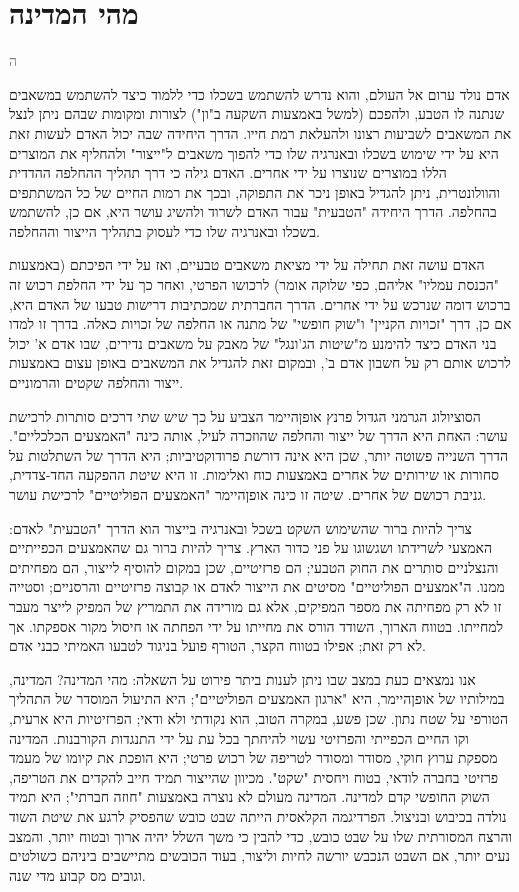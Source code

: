 \documentclass[10pt,oneside]{book}
\newcommand{\hebrewchapter}[2]{%
  \chapter*{#1}%
  \addcontentsline{toc}{chapter}{#1}%
  \lettrine[lines=4, lhang=0.1, loversize=0.5, findent=0pt]{\textcolor{gray} #2}{}%
}
\begin{document}
\hebrewchapter{מהי המדינה}{ה}
אדם נולד ערום אל העולם, והוא נדרש להשתמש בשכלו כדי ללמוד כיצד להשתמש במשאבים שנתנה לו הטבע, ולהפכם (למשל באמצעות השקעה ב"ון") לצורות ומקומות שבהם ניתן לנצל את המשאבים לשביעות רצונו ולהעלאת רמת חייו. הדרך היחידה שבה יכול האדם לעשות זאת היא על ידי שימוש בשכלו ובאנרגיה שלו כדי להפוך משאבים ל"ייצור" ולהחליף את המוצרים הללו במוצרים שנוצרו על ידי אחרים. האדם גילה כי דרך תהליך ההחלפה ההדדית והוולונטרית, ניתן להגדיל באופן ניכר את התפוקה, ובכך את רמות החיים של כל המשתתפים בהחלפה. הדרך היחידה "הטבעית" עבור האדם לשרוד ולהשיג עושר היא, אם כן, להשתמש בשכלו ובאנרגיה שלו כדי לעסוק בתהליך הייצור וההחלפה.

האדם עושה זאת תחילה על ידי מציאת משאבים טבעיים, ואז על ידי הפיכתם (באמצעות "הכנסת עמליו" אליהם, כפי שלוקה אומר) לרכושו הפרטי, ואחר כך על ידי החלפת רכוש זה ברכוש דומה שנרכש על ידי אחרים. הדרך החברתית שמכתיבות דרישות טבעו של האדם היא, אם כן, דרך "זכויות הקניין" ו"שוק חופשי" של מתנה או החלפה של זכויות כאלה. בדרך זו למדו בני האדם כיצד להימנע מ"שיטות הג'ונגל" של מאבק על משאבים נדירים, שבו אדם א' יכול לרכוש אותם רק על חשבון אדם ב', ובמקום זאת להגדיל את המשאבים באופן עצום באמצעות ייצור והחלפה שקטים והרמוניים.

הסוציולוג הגרמני הגדול פרנץ אופןהיימר הצביע על כך שיש שתי דרכים סותרות לרכישת עושר: האחת היא הדרך של ייצור והחלפה שהוזכרה לעיל, אותה כינה "האמצעים הכלכליים". הדרך השנייה פשוטה יותר, שכן היא אינה דורשת פרודוקטיביות; היא הדרך של השתלטות על סחורות או שירותים של אחרים באמצעות כוח ואלימות. זו היא שיטת ההפקעה החד-צדדית, גניבת רכושם של אחרים. שיטה זו כינה אופןהיימר "האמצעים הפוליטיים" לרכישת עושר.

צריך להיות ברור שהשימוש השקט בשכל ובאנרגיה בייצור הוא הדרך "הטבעית" לאדם: האמצעי לשרידתו ושגשוגו על פני כדור הארץ. צריך להיות ברור גם שהאמצעים הכפייתיים והנצלניים סותרים את החוק הטבעי; הם פרזיטיים, שכן במקום להוסיף לייצור, הם מפחיתים ממנו. ה"אמצעים הפוליטיים" מסיטים את הייצור לאדם או קבוצה פרזיטיים והרסניים; וסטייה זו לא רק מפחיתה את מספר המפיקים, אלא גם מורידה את התמריץ של המפיק לייצר מעבר למחייתו. בטווח הארוך, השודד הורס את מחייתו על ידי הפחתה או חיסול מקור אספקתו. אך לא רק זאת; אפילו בטווח הקצר, הטורף פועל בניגוד לטבעו האמיתי כבני אדם.

אנו נמצאים כעת במצב שבו ניתן לענות ביתר פירוט על השאלה: מהי המדינה? המדינה, במילותיו של אופןהיימר, היא "ארגון האמצעים הפוליטיים"; היא התיעול המוסדר של התהליך הטורפי על שטח נתון. שכן פשע, במקרה הטוב, הוא נקודתי ולא ודאי; הפרזיטיות היא ארעית, וקו החיים הכפייתי והפרזיטי עשוי להיחתך בכל עת על ידי התנגדות הקורבנות. המדינה מספקת ערוץ חוקי, מסודר ומסודר לטריפה של רכוש פרטי; היא הופכת את קיומו של מעמד פרזיטי בחברה לודאי, בטוח ויחסית "שקט". מכיוון שהייצור תמיד חייב להקדים את הטריפה, השוק החופשי קדם למדינה. המדינה מעולם לא נוצרה באמצעות "חוזה חברתי"; היא תמיד נולדה בכיבוש ובניצול. הפרדיגמה הקלאסית הייתה שבט כובש שהפסיק לרגע את שיטת השוד והרצח המסורתית שלו על שבט כובש, כדי להבין כי משך השלל יהיה ארוך ובטוח יותר, והמצב נעים יותר, אם השבט הנכבש יורשה לחיות וליצור, בעוד הכובשים מתיישבים ביניהם כשולטים וגובים מס קבוע מדי שנה.
\end{document}
